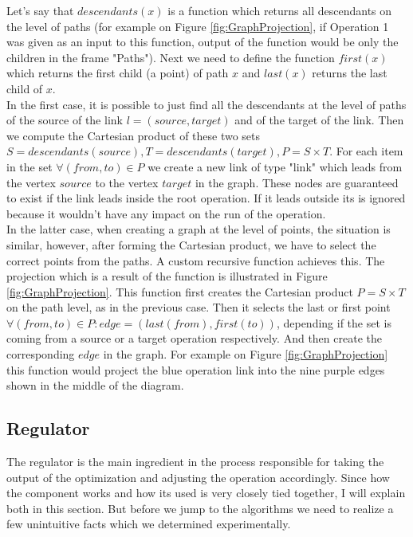 Let’s say that $descendants(x)$ is a function which returns all descendants on the level of paths (for example on Figure \ref{fig:GraphProjection}, if Operation 1 was given as an input to this function, output of the function would be only the children in the frame "Paths"). Next we need to define the function $first(x)$ which returns the first child (a point) of path $x$ and $last(x)$ returns the last child of $x$.\\

In the first case, it is possible to just find all the descendants at the level of paths of the source of the link $l = (source, target)$ and of the target of the link.
Then we compute the Cartesian product of these two sets $S = descendants(source), T = descendants(target), P = S \times T$. 
For each item in the set $\forall (from, to) \in P$ we create a new link of type "link" which leads from the vertex $source$ to the vertex $target$ in the graph. 
These nodes are guaranteed to exist if the link leads inside the root operation. 
If it leads outside its is ignored because it wouldn't have any impact on the run of the operation. \\

In the latter case, when creating a graph at the level of points, the situation is similar, however, after forming the Cartesian product, we have to select the correct points from the paths. A custom recursive function  achieves this. The projection which is a result of the function is illustrated in Figure \ref{fig:GraphProjection}. This function first creates the Cartesian product $P = S \times T$ on the path level, as in the previous case. Then it selects the last or first point $\forall (from, to) \in P: edge = (last(from), first(to))$, depending if the set is coming from a source or a target operation respectively. And then create the corresponding $edge$ in the graph. For example on Figure \ref{fig:GraphProjection} this function would project the blue operation link into the nine purple edges shown in the middle of the diagram.

\subsection{Regulator}


The regulator is the main ingredient in the process responsible for taking the output of the optimization and adjusting the operation accordingly. Since how the component works and how its used is very closely tied together, I will explain both in this section. But before we jump to the algorithms we need to realize a few unintuitive facts which we determined experimentally. \\

